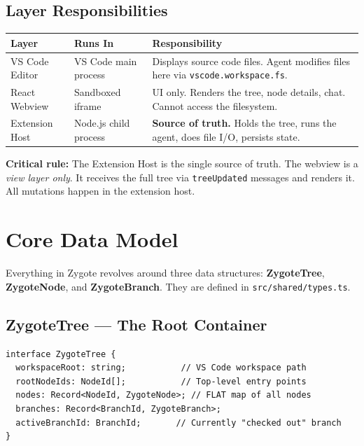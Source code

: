 \documentclass[12pt, a4paper]{article}
\begin{document}
\subsection{Layer Responsibilities}

\begin{table}[H]
\centering
\begin{tabular}{@{}p{3cm}p{4.5cm}p{5.5cm}@{}}
\toprule
\textbf{Layer} & \textbf{Runs In} & \textbf{Responsibility} \\
\midrule
VS Code Editor & VS Code main process & Displays source code files. Agent modifies files here via \texttt{vscode.workspace.fs}. \\[6pt]
React Webview & Sandboxed iframe & UI only. Renders the tree, node details, chat. Cannot access the filesystem. \\[6pt]
Extension Host & Node.js child process & \textbf{Source of truth.} Holds the tree, runs the agent, does file I/O, persists state. \\
\bottomrule
\end{tabular}
\end{table}

\begin{warningbox}
\textbf{Critical rule:} The Extension Host is the single source of truth. The webview is a \textit{view layer only}. It receives the full tree via \texttt{treeUpdated} messages and renders it. All mutations happen in the extension host.
\end{warningbox}

\newpage

\section{Core Data Model}

Everything in Zygote revolves around three data structures: \textbf{ZygoteTree}, \textbf{ZygoteNode}, and \textbf{ZygoteBranch}. They are defined in \texttt{src/shared/types.ts}.

\subsection{ZygoteTree --- The Root Container}

\begin{lstlisting}
interface ZygoteTree {
  workspaceRoot: string;           // VS Code workspace path
  rootNodeIds: NodeId[];           // Top-level entry points
  nodes: Record<NodeId, ZygoteNode>; // FLAT map of all nodes
  branches: Record<BranchId, ZygoteBranch>;
  activeBranchId: BranchId;       // Currently "checked out" branch
}
\end{lstlisting}
\end{document}
